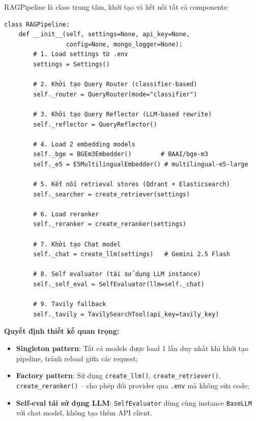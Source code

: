 \documentclass[../DoAn.tex]{subfiles}
\begin{document}
RAGPipeline là class trung tâm, khởi tạo và kết nối tất cả components:
\begin{verbatim}
class RAGPipeline:
    def __init__(self, settings=None, api_key=None,
                 config=None, mongo_logger=None):
        # 1. Load settings từ .env
        settings = Settings()

        # 2. Khởi tạo Query Router (classifier-based)
        self._router = QueryRouter(mode="classifier")

        # 3. Khởi tạo Query Reflector (LLM-based rewrite)
        self._reflector = QueryReflector()

        # 4. Load 2 embedding models
        self._bge = BGEm3Embedder()        # BAAI/bge-m3
        self._e5 = E5MultilingualEmbedder() # multilingual-e5-large

        # 5. Kết nối retrieval stores (Qdrant + Elasticsearch)
        self._searcher = create_retriever(settings)

        # 6. Load reranker
        self._reranker = create_reranker(settings)

        # 7. Khởi tạo Chat model
        self._chat = create_llm(settings)   # Gemini 2.5 Flash

        # 8. Self evaluator (tái sử dụng LLM instance)
        self._self_eval = SelfEvaluator(llm=self._chat)

        # 9. Tavily fallback
        self._tavily = TavilySearchTool(api_key=tavily_key)
\end{verbatim}

\textbf{Quyết định thiết kế quan trọng:}
\begin{itemize}
    \item \textbf{Singleton pattern}: Tất cả models được load 1 lần duy nhất khi khởi tạo pipeline, tránh reload giữa các request;
    \item \textbf{Factory pattern}: Sử dụng \texttt{create\_llm()}, \texttt{create\_retriever()}, \texttt{create\_reranker()} -- cho phép đổi provider qua \texttt{.env} mà không sửa code;
    \item \textbf{Self-eval tái sử dụng LLM}: \texttt{SelfEvaluator} dùng cùng instance \texttt{BaseLLM} với chat model, không tạo thêm API client.
\end{itemize}
\end{document}
